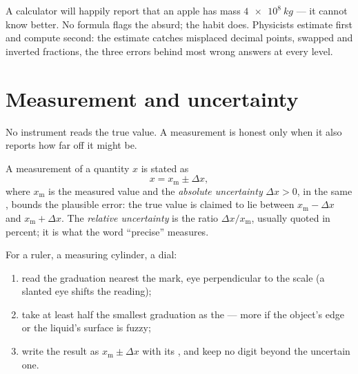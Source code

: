 \begin{remark}\label{rem:g10:orders-of-magnitude:sanity}
A calculator will happily report that an apple has mass
$\qty{4e8}{kg}$ --- it cannot know better. No formula flags the
absurd; the habit does. Physicists estimate first and compute second:
the estimate catches misplaced decimal points, swapped  and
inverted fractions, the three errors behind most wrong answers at
every level.
\end{remark}

\section{Measurement and uncertainty}

No instrument reads the true value. A measurement is honest only when
it also reports how far off it might be.

\begin{definition}\label{def:g10:orders-of-magnitude:uncertainty}
A measurement of a quantity $x$ is stated as
\[
x = x_{\text{m}} \pm \Delta x ,
\]
where $x_{\text{m}}$ is the measured value and the \emph{absolute
uncertainty} $\Delta x > 0$, in the same
, bounds the plausible error: the true value is claimed to lie
between $x_{\text{m}} - \Delta x$ and $x_{\text{m}} + \Delta x$. The
\emph{relative uncertainty} is the ratio
$\Delta x / x_{\text{m}}$, usually quoted in percent; it is what the
word ``precise'' measures.
\end{definition}

\begin{method}\label{met:g10:orders-of-magnitude:reading}
For a ruler, a measuring cylinder, a dial:
\begin{enumerate}
  \item read the graduation nearest the mark, eye perpendicular to the
        scale (a slanted eye shifts the reading);
  \item take at least half the smallest graduation as the  --- more if the object's edge or the liquid's
        surface is fuzzy;
  \item write the result as $x_{\text{m}} \pm \Delta x$ with its ,
        and keep no digit beyond the uncertain one.
\end{enumerate}
\end{method}

